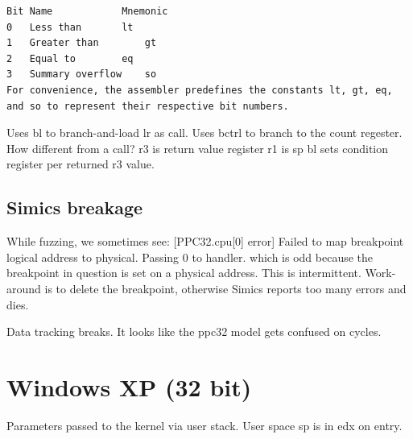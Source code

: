 \documentclass[titlepage]{article}
\begin{document}
\begin{appendices}
\begin{verbatim}
Bit	Name			Mnemonic
0	Less than		lt
1	Greater than		gt
2	Equal to		eq
3	Summary overflow	so
For convenience, the assembler predefines the constants lt, gt, eq, and so to represent their respective bit numbers.
\end{verbatim}
Uses bl to branch-and-load lr as call.
Uses bctrl to branch to the count regester.  How different from a call?
r3 is return value register
r1 is sp
bl sets condition register per returned r3 value.

\subsection{Simics breakage}
While fuzzing, we sometimes see:
  [PPC32.cpu[0] error] Failed to map breakpoint logical address to physical. Passing 0 to handler.
which is odd because the breakpoint in question is set on a physical address.  This is intermittent.
Work-around is to delete the breakpoint, otherwise Simics reports too many errors and dies.

Data tracking breaks.  It looks like the ppc32 model gets confused on cycles.

\section{Windows XP (32 bit)}
Parameters passed to the kernel via user stack.
User space sp is in edx on entry.


\end{appendices}
\end{document}
